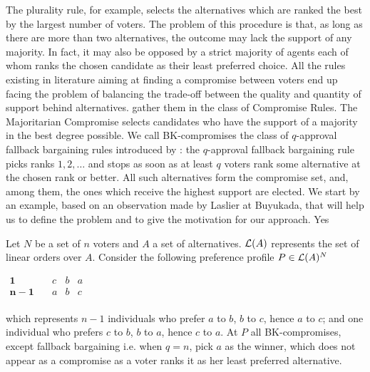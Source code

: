 \documentclass[version=3.21, pagesize, twoside=off, bibliography=totoc, DIV=calc, fontsize=12pt, a4paper]{scrartcl}
\begin{document}
The plurality rule, for example, selects the alternatives which are ranked the best by the largest number of voters. The problem of this procedure is that, as long as there are more than two alternatives, the outcome may lack the support of any majority. In fact, it may also be opposed by a strict majority of agents each of whom ranks the chosen candidate as their least preferred choice. All the rules existing in literature aiming at finding a compromise between voters end up facing the problem of balancing the trade-off between the quality and quantity of support behind alternatives. \citet{Merlin2019} gather them in the class of Compromise Rules. The Majoritarian Compromise \citep{Sertel1999} selects candidates who have the support of a majority in the best degree possible. 
We call BK-compromises the class of $q$-approval fallback bargaining rules introduced by \citet{Brams2001}: the $q$-approval fallback bargaining rule picks ranks $1, 2, \dots$ and stops as soon as at least $q$ voters rank some alternative at the chosen rank or better. All such alternatives form the compromise set, and, among them, the ones which receive the highest support are elected.
We start by an example, based on an observation made by Laslier at Buyukada, that will help us to define the problem and to give the motivation for our approach. Yes

\begin{example}
	\label{ex:ex1}
	Let $N$ be a set of $n$ voters and $A$ a set of alternatives. $\mathcal{L}(A)$ represents the set of linear orders over $A$. Consider the following preference profile $P\in \mathcal{L}(A)^{N}$
	\begin{center}
		$
		\begin{array}{cccc}
		\mathbf{1} \quad &c&b&a\\
		\mathbf{n-1} \quad &a&b&c\\
		\end{array}
		$
	\end{center}
	which represents $n-1$ individuals who prefer $a$ to $b$, $b$ to $c$, hence $a$ to $c$; and one individual who prefers $c$ to $b$, $b$ to $a$, hence $c$ to $a $. At $P$ all BK-compromises, except fallback bargaining i.e. when $q=n$, pick $a$ as the winner, which does not appear as a compromise as a voter ranks it as her least preferred alternative.
\end{example}
\end{document}
